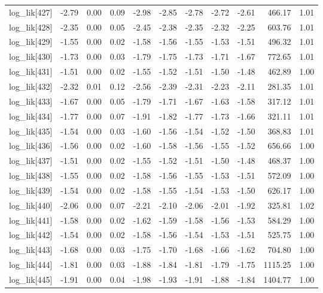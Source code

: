 \begin{table}[ht]
\begin{tabular}{rrrrrrrrrrr}
  log\_lik[427] & -2.79 & 0.00 & 0.09 & -2.98 & -2.85 & -2.78 & -2.72 & -2.61 & 466.17 & 1.01 \\ 
  log\_lik[428] & -2.35 & 0.00 & 0.05 & -2.45 & -2.38 & -2.35 & -2.32 & -2.25 & 603.76 & 1.01 \\ 
  log\_lik[429] & -1.55 & 0.00 & 0.02 & -1.58 & -1.56 & -1.55 & -1.53 & -1.51 & 496.32 & 1.01 \\ 
  log\_lik[430] & -1.73 & 0.00 & 0.03 & -1.79 & -1.75 & -1.73 & -1.71 & -1.67 & 772.65 & 1.01 \\ 
  log\_lik[431] & -1.51 & 0.00 & 0.02 & -1.55 & -1.52 & -1.51 & -1.50 & -1.48 & 462.89 & 1.00 \\ 
  log\_lik[432] & -2.32 & 0.01 & 0.12 & -2.56 & -2.39 & -2.31 & -2.23 & -2.11 & 281.35 & 1.01 \\ 
  log\_lik[433] & -1.67 & 0.00 & 0.05 & -1.79 & -1.71 & -1.67 & -1.63 & -1.58 & 317.12 & 1.01 \\ 
  log\_lik[434] & -1.77 & 0.00 & 0.07 & -1.91 & -1.82 & -1.77 & -1.73 & -1.66 & 321.11 & 1.01 \\ 
  log\_lik[435] & -1.54 & 0.00 & 0.03 & -1.60 & -1.56 & -1.54 & -1.52 & -1.50 & 368.83 & 1.01 \\ 
  log\_lik[436] & -1.56 & 0.00 & 0.02 & -1.60 & -1.58 & -1.56 & -1.55 & -1.52 & 656.66 & 1.00 \\ 
  log\_lik[437] & -1.51 & 0.00 & 0.02 & -1.55 & -1.52 & -1.51 & -1.50 & -1.48 & 468.37 & 1.00 \\ 
  log\_lik[438] & -1.55 & 0.00 & 0.02 & -1.58 & -1.56 & -1.55 & -1.53 & -1.51 & 572.09 & 1.00 \\ 
  log\_lik[439] & -1.54 & 0.00 & 0.02 & -1.58 & -1.55 & -1.54 & -1.53 & -1.50 & 626.17 & 1.00 \\ 
  log\_lik[440] & -2.06 & 0.00 & 0.07 & -2.21 & -2.10 & -2.06 & -2.01 & -1.92 & 325.81 & 1.02 \\ 
  log\_lik[441] & -1.58 & 0.00 & 0.02 & -1.62 & -1.59 & -1.58 & -1.56 & -1.53 & 584.29 & 1.00 \\ 
  log\_lik[442] & -1.54 & 0.00 & 0.02 & -1.58 & -1.56 & -1.54 & -1.53 & -1.51 & 525.75 & 1.00 \\ 
  log\_lik[443] & -1.68 & 0.00 & 0.03 & -1.75 & -1.70 & -1.68 & -1.66 & -1.62 & 704.80 & 1.00 \\ 
  log\_lik[444] & -1.81 & 0.00 & 0.03 & -1.88 & -1.84 & -1.81 & -1.79 & -1.75 & 1115.25 & 1.00 \\ 
  log\_lik[445] & -1.91 & 0.00 & 0.04 & -1.98 & -1.93 & -1.91 & -1.88 & -1.84 & 1404.77 & 1.00 \\ 

\end{tabular}
\end{table}
